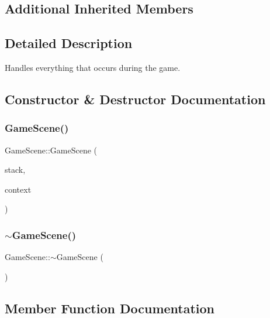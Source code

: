 \subsection*{Additional Inherited Members}


\subsection{Detailed Description}
Handles everything that occurs during the game. 



\subsection{Constructor \& Destructor Documentation}
\mbox{\label{class_game_scene_a09ae1eacea6ea92074d008c016e0ed1f}} 
\subsubsection{\texorpdfstring{Game\+Scene()}{GameScene()}}
{\footnotesize\ttfamily Game\+Scene\+::\+Game\+Scene (\begin{DoxyParamCaption}\item[{\hyperlink{class_scene_stack}{Scene\+Stack} \&}]{stack,  }\item[{\hyperlink{struct_scene_1_1_context}{Context}}]{context }\end{DoxyParamCaption})}

\mbox{\label{class_game_scene_add5bc48c372aaa7f526c02558a8adf00}} 
\subsubsection{\texorpdfstring{$\sim$\+Game\+Scene()}{~GameScene()}}
{\footnotesize\ttfamily Game\+Scene\+::$\sim$\+Game\+Scene (\begin{DoxyParamCaption}{ }\end{DoxyParamCaption})}



\subsection{Member Function Documentation}
\mbox{\label{class_game_scene_ae9eb60cbb8fa55eeb07b951e3d83f426}} 
